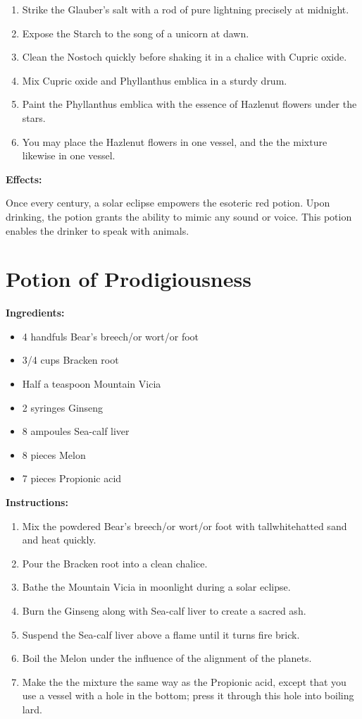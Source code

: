 \documentclass{article}
\begin{document}
\begin{enumerate}
  \item Strike the Glauber's salt with a rod of pure lightning precisely at midnight.
  \item Expose the Starch to the song of a unicorn at dawn.
  \item Clean the Nostoch quickly before shaking it in a chalice with Cupric oxide.
  \item Mix Cupric oxide and Phyllanthus emblica in a sturdy drum.
  \item Paint the Phyllanthus emblica with the essence of Hazlenut flowers under the stars.
  \item You may place the Hazlenut flowers in one vessel, and the the mixture likewise in one vessel.
\end{enumerate}

\textbf{Effects:}

Once every century, a solar eclipse empowers the esoteric red potion. Upon drinking, the potion grants the ability to mimic any sound or voice. This potion enables the drinker to speak with animals.

\newpage
\section*{Potion of Prodigiousness}

\textbf{Ingredients:}

\begin{itemize}
  \item 4 handfuls Bear's breech/or wort/or foot
  \item 3/4 cups Bracken root
  \item Half a teaspoon Mountain Vicia
  \item 2 syringes Ginseng
  \item 8 ampoules Sea-calf liver
  \item 8 pieces Melon
  \item 7 pieces Propionic acid
\end{itemize}

\textbf{Instructions:}

\begin{enumerate}
  \item Mix the powdered Bear's breech/or wort/or foot with tallwhitehatted sand and heat quickly.
  \item Pour the Bracken root into a clean chalice.
  \item Bathe the Mountain Vicia in moonlight during a solar eclipse.
  \item Burn the Ginseng along with Sea-calf liver to create a sacred ash.
  \item Suspend the Sea-calf liver above a flame until it turns fire brick.
  \item Boil the Melon under the influence of the alignment of the planets.
  \item Make the the mixture the same way as the Propionic acid, except that you use a vessel with a hole in the bottom; press it through this hole into boiling lard.
\end{enumerate}
\end{document}
